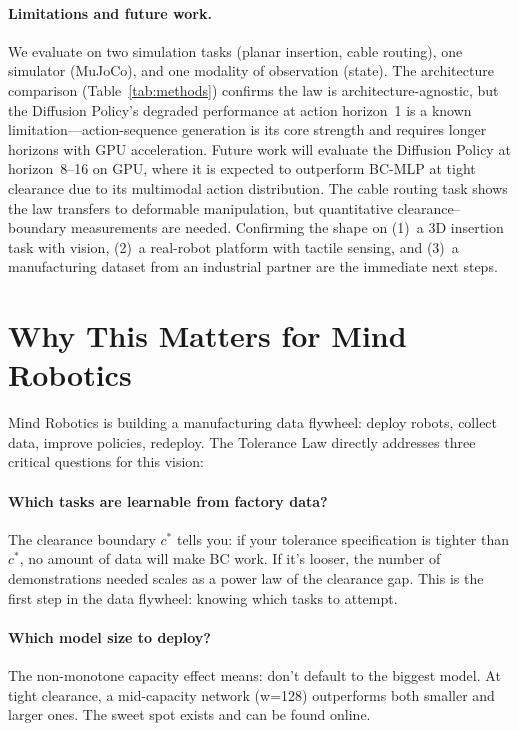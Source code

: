 \documentclass[11pt]{article}
\begin{document}
\paragraph{Limitations and future work.}
We evaluate on two simulation tasks (planar insertion, cable routing), one
simulator (MuJoCo), and one modality of observation (state). The
architecture comparison (Table~\ref{tab:methods}) confirms the law is
architecture-agnostic, but the Diffusion Policy's degraded performance at
action horizon~1 is a known limitation---action-sequence generation is its
core strength and requires longer horizons with GPU acceleration. Future
work will evaluate the Diffusion Policy at horizon~8--16 on GPU, where it
is expected to outperform BC-MLP at tight clearance due to its multimodal
action distribution. The cable routing task shows the law transfers to
deformable manipulation, but quantitative clearance--boundary measurements
are needed. Confirming the shape on (1)~a 3D insertion task with vision,
(2)~a real-robot platform with tactile sensing, and (3)~a manufacturing
dataset from an industrial partner are the immediate next steps.

\section{Why This Matters for Mind Robotics}

Mind Robotics is building a manufacturing data flywheel: deploy robots, collect
data, improve policies, redeploy. The Tolerance Law directly addresses three
critical questions for this vision:

\paragraph{Which tasks are learnable from factory data?}
The clearance boundary $c^*$ tells you: if your tolerance specification is
tighter than $c^*$, no amount of data will make BC work. If it's looser, the
number of demonstrations needed scales as a power law of the clearance gap.
This is the first step in the data flywheel: knowing which tasks to attempt.

\paragraph{Which model size to deploy?}
The non-monotone capacity effect means: don't default to the biggest model.
At tight clearance, a mid-capacity network (w=128) outperforms both smaller
and larger ones. The sweet spot exists and can be found online.
\end{document}
